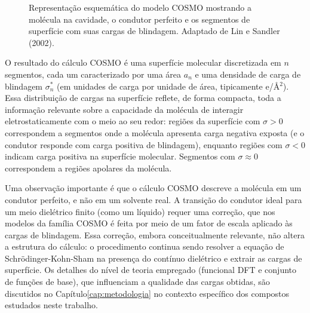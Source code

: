 \begin{figure}[H]
    \vspace{0.5cm}
    \caption{Representação esquemática do modelo COSMO mostrando
    a molécula na cavidade, o condutor perfeito e os segmentos de
    superfície com suas cargas de blindagem. Adaptado de Lin e Sandler (2002).}
    \label{fig:cosmo_cavity}
\end{figure}

O resultado do cálculo COSMO é uma superfície molecular discretizada em $n$ segmentos, cada um caracterizado por uma área $a_n$ e uma densidade de carga de blindagem $\sigma_n^{*}$ (em unidades de carga por unidade de área, tipicamente e/\AA$^2$). Essa distribuição de cargas na superfície reflete, de forma compacta, toda a informação relevante sobre a capacidade da molécula de interagir eletrostaticamente com o meio ao seu redor: regiões da superfície com $\sigma > 0$ correspondem a segmentos onde a molécula apresenta carga negativa exposta (e o condutor responde com carga positiva de blindagem), enquanto regiões com $\sigma < 0$ indicam carga positiva na superfície molecular. Segmentos com $\sigma \approx 0$ correspondem a regiões apolares da molécula\cite{lin2002}. 

Uma observação importante é que o cálculo COSMO descreve a molécula em um condutor perfeito, e não em um solvente real. A transição do condutor ideal para um meio dielétrico finito (como um líquido) requer uma correção, que nos modelos da família COSMO é feita por meio de um fator de escala aplicado às cargas de blindagem\cite{klamt1995}. Essa correção, embora conceitualmente relevante, não altera a estrutura do cálculo: o procedimento continua sendo resolver a equação de Schrödinger-Kohn-Sham na presença do contínuo dielétrico e extrair as cargas de superfície. Os detalhes do nível de teoria empregado (funcional DFT e conjunto de funções de base), que influenciam a qualidade das cargas obtidas, são discutidos no Capítulo\ref{cap:metodologia} no contexto específico dos compostos estudados neste trabalho.


